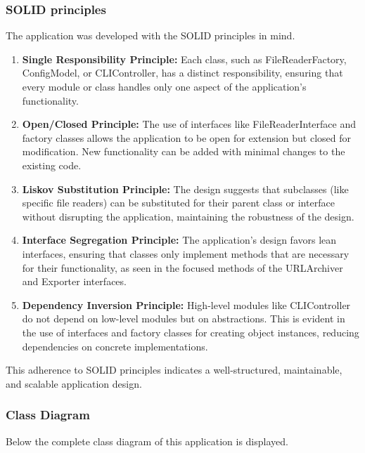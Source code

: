 \subsubsection{SOLID principles}
The application was developed with the SOLID principles in mind. 
\begin{enumerate}
    \item \textbf{Single Responsibility Principle:} Each class, such as FileReaderFactory, ConfigModel, or CLIController, has a distinct responsibility, ensuring that every module or class handles only one aspect of the application's functionality.
    \item \textbf{Open/Closed Principle:} The use of interfaces like FileReaderInterface and factory classes allows the application to be open for extension but closed for modification. New functionality can be added with minimal changes to the existing code.
    \item \textbf{Liskov Substitution Principle:} The design suggests that subclasses (like specific file readers) can be substituted for their parent class or interface without disrupting the application, maintaining the robustness of the design.
    \item \textbf{Interface Segregation Principle:} The application's design favors lean interfaces, ensuring that classes only implement methods that are necessary for their functionality, as seen in the focused methods of the URLArchiver and Exporter interfaces.
    \item \textbf{Dependency Inversion Principle:} High-level modules like CLIController do not depend on low-level modules but on abstractions. This is evident in the use of interfaces and factory classes for creating object instances, reducing dependencies on concrete implementations.
\end{enumerate}

This adherence to SOLID principles indicates a well-structured, maintainable, and scalable application design.

\subsubsection{Class Diagram}
Below the complete class diagram of this application is displayed. 

\clearpage



